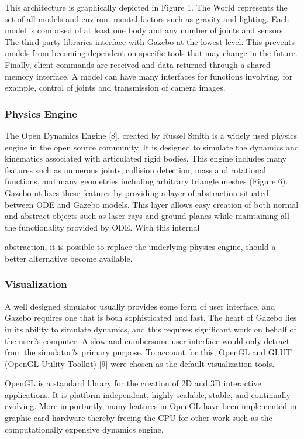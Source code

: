 This architecture is graphically depicted in Figure 1. The World represents the set of all models and environ- mental factors such as gravity and lighting. Each model is composed of at least one body and any number of joints and sensors. The third party libraries interface with Gazebo at the lowest level. This prevents models from becoming dependent on specific tools that may change in the future. Finally, client commands are received and data returned through a shared memory interface. A model can have many interfaces for functions involving, for example, control of joints and transmission of camera images.

\subsubsection{Physics Engine}

The Open Dynamics Engine [8], created by Russel Smith is a widely used physics engine in the open source community. It is designed to simulate the dynamics and kinematics associated with articulated rigid bodies. This engine includes many features such as numerous joints, collision detection, mass and rotational functions, and many geometries including arbitrary triangle meshes (Figure 6). Gazebo utilizes these features by providing a layer of abstraction situated between ODE and Gazebo models. This layer allows easy creation of both normal and abstract objects such as laser rays and ground planes while maintaining all the functionality provided by ODE. With this internal

abstraction, it is possible to replace the underlying physics engine, should a better alternative become available.

\subsubsection{Visualization}

A well designed simulator usually provides some form of user interface, and Gazebo requires one that is both sophisticated and fast. The heart of Gazebo lies in its ability to simulate dynamics, and this requires significant work on behalf of the user?s computer. A slow and cumbersome user interface would only detract from the simulator?s primary purpose. To account for this, OpenGL and GLUT (OpenGL Utility Toolkit) [9] were chosen as the default visualization tools.

OpenGL is a standard library for the creation of 2D and 3D interactive applications. It is platform independent, highly scalable, stable, and continually evolving. More importantly, many features in OpenGL have been implemented in graphic card hardware thereby freeing the CPU for other work such as the computationally expensive dynamics engine.

